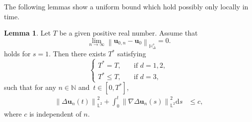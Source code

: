 \documentclass[11pt,reqno]{amsart}
\theoremstyle{definition}
\newtheorem{lemma}[theorem]{Lemma}
\numberwithin{equation}{section}
\newcommand{\bff}{\boldsymbol}
\newcommand{\bb}{\mathbb}
\newcommand{\ds}{\mathrm{d}s}
\newcommand{\norm}[2]{\left\|{#1}\right\|_{#2}}
\begin{document}
The following lemmas show a uniform bound which hold possibly only locally in time.

\begin{lemma}\label{lem:H2 un}
	Let $T$ be a given positive real number. Assume that 
    \begin{equation}\label{equ:fur ass Hs}
		\lim_{n\to\infty}
		\norm{\bff{u}_{0,n}-\bff{u}_0}{\bb{H}^s_\Delta} = 0.
	\end{equation}
   holds for $s=1$. Then there exists $T^\ast$ satisfying
\begin{equation}\label{equ:T ast}
		\begin{cases}
			T^\ast = T, \quad & \text{if } d=1,2,
			\\
			T^\ast \le T, \quad & \text{if } d=3,
		\end{cases}
	\end{equation}
    such that for any $n\in \bb{N}$ and~$t\in[0,T^\ast]$,
	\begin{align}\label{equ:Delta un llb}
		\norm{\Delta \bff{u}_n(t)}{\bb{L}^2}^2
		+
		\int_0^t \norm{\nabla \Delta \bff{u}_n(s)}{\bb{L}^2}^2 \ds 
		&\leq c,
	\end{align}
	where $c$ is independent of $n$.
\end{lemma}
\end{document}
